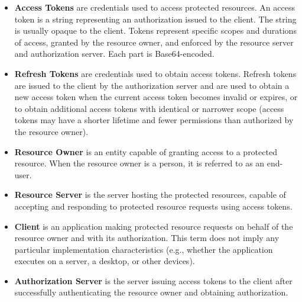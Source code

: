 \begin{itemize}
    \item \textbf{Access Tokens} are credentials used to access protected resources.
    An access token is a string representing an authorization issued to the client.
    The string is usually opaque to the client.
    Tokens represent specific scopes and
    durations of access, granted by the resource owner, and enforced by the resource server and authorization server.
    Each part is Base64-encoded.
    \item \textbf{Refresh Tokens} are credentials used to obtain access tokens.
    Refresh tokens are issued to the client
    by the authorization server and are used to obtain a new access token when the current access token becomes invalid or expires,
    or to obtain additional access tokens with identical or narrower scope (access tokens may have a shorter lifetime and
    fewer permissions than authorized by the resource owner).
    \item \textbf{Resource Owner} is an entity capable of granting access to a protected resource.
    When the resource owner is a person, it is referred to as an end-user.
    \item \textbf{Resource Server} is the server hosting the protected resources, capable of accepting and responding to protected
    resource requests using access tokens.
    \item \textbf{Client} is an application making protected resource requests on behalf of the resource owner and with its authorization.
    This term does not imply any particular implementation characteristics (e.g., whether the application executes on a server,
    a desktop, or other devices).
    \item \textbf{Authorization Server} is the server issuing access tokens to the client after successfully authenticating the resource owner
    and obtaining authorization.
\end{itemize}